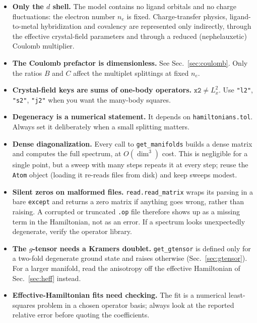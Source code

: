 \documentclass[11pt,a4paper]{article}
\newcommand{\op}[1]{\texttt{#1}}
\begin{document}
\begin{itemize}
\item \textbf{Only the $d$ shell.}  The model contains no ligand orbitals and no
      charge fluctuations: the electron number $n_e$ is fixed.  Charge-transfer
      physics, ligand-to-metal hybridization and covalency are represented only
      indirectly, through the effective crystal-field parameters and through a
      reduced (nephelauxetic) Coulomb multiplier.

\item \textbf{The Coulomb prefactor is dimensionless.}  See
      Sec.~\ref{sec:coulomb}.  Only the ratios $B$ and $C$ affect the multiplet
      splittings at fixed $n_e$.

\item \textbf{Crystal-field keys are sums of one-body operators.}
      $\op{x2}\neq L_x^2$.  Use \op{"l2"}, \op{"s2"}, \op{"j2"} when you want
      the many-body squares.

\item \textbf{Degeneracy is a numerical statement.}  It depends on
      \op{hamiltonians.tol}.  Always set it deliberately when a small splitting
      matters.

\item \textbf{Dense diagonalization.}  Every call to \op{get\_manifolds} builds a
      dense matrix and computes the full spectrum, at $O(\dim^3)$ cost.  This is
      negligible for a single point, but a sweep with many steps repeats it at
      every step; reuse the \op{Atom} object (loading it re-reads files from
      disk) and keep sweeps modest.

\item \textbf{Silent zeros on malformed files.}  \op{read.read\_matrix} wraps its
      parsing in a bare \op{except} and returns a zero matrix if anything goes
      wrong, rather than raising.  A corrupted or truncated \op{.op} file
      therefore shows up as a missing term in the Hamiltonian, not as an error.
      If a spectrum looks unexpectedly degenerate, verify the operator library.

\item \textbf{The $g$-tensor needs a Kramers doublet.}  \op{get\_gtensor} is
      defined only for a two-fold degenerate ground state and raises otherwise
      (Sec.~\ref{sec:gtensor}).  For a larger manifold, read the anisotropy off
      the effective Hamiltonian of Sec.~\ref{sec:heff} instead.

\item \textbf{Effective-Hamiltonian fits need checking.}  The fit is a numerical
      least-squares problem in a chosen operator basis; always look at the
      reported relative error before quoting the coefficients.


\end{itemize}
\end{document}
